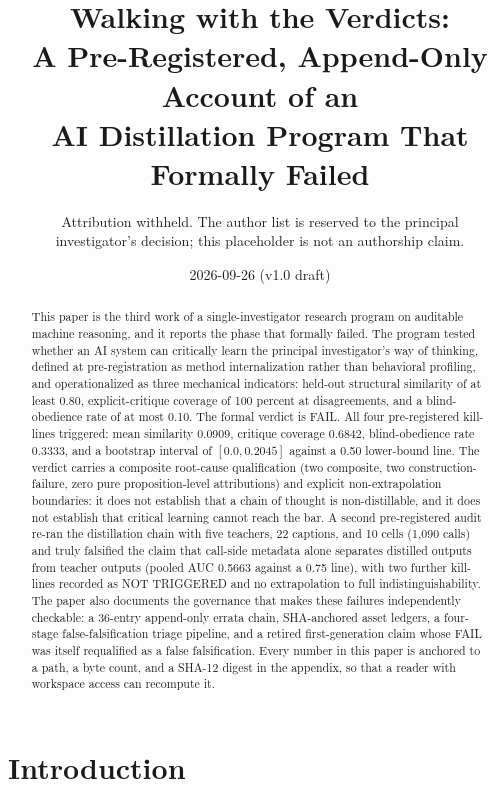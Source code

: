 \documentclass[11pt]{article}
\title{\bfseries Walking with the Verdicts:\\ A Pre-Registered, Append-Only Account of an\\ AI Distillation Program That Formally Failed}
\author{Attribution withheld. The author list is reserved to the principal\\ investigator's decision; this placeholder is not an authorship claim.}
\date{2026-09-26 (v1.0 draft)}
\begin{document}
\maketitle

\begin{abstract}
\noindent
This paper is the third work of a single-investigator research program on auditable machine reasoning, and it reports the phase that formally failed. The program tested whether an AI system can critically learn the principal investigator's way of thinking, defined at pre-registration as method internalization rather than behavioral profiling, and operationalized as three mechanical indicators: held-out structural similarity of at least 0.80, explicit-critique coverage of 100 percent at disagreements, and a blind-obedience rate of at most 0.10. The formal verdict is FAIL. All four pre-registered kill-lines triggered: mean similarity 0.0909, critique coverage 0.6842, blind-obedience rate 0.3333, and a bootstrap interval of $[0.0, 0.2045]$ against a 0.50 lower-bound line. The verdict carries a composite root-cause qualification (two composite, two construction-failure, zero pure proposition-level attributions) and explicit non-extrapolation boundaries: it does not establish that a chain of thought is non-distillable, and it does not establish that critical learning cannot reach the bar. A second pre-registered audit re-ran the distillation chain with five teachers, 22 captions, and 10 cells (1,090 calls) and truly falsified the claim that call-side metadata alone separates distilled outputs from teacher outputs (pooled AUC 0.5663 against a 0.75 line), with two further kill-lines recorded as NOT TRIGGERED and no extrapolation to full indistinguishability. The paper also documents the governance that makes these failures independently checkable: a 36-entry append-only errata chain, SHA-anchored asset ledgers, a four-stage false-falsification triage pipeline, and a retired first-generation claim whose FAIL was itself requalified as a false falsification. Every number in this paper is anchored to a path, a byte count, and a SHA-12 digest in the appendix, so that a reader with workspace access can recompute it.
\end{abstract}

\section{Introduction}
\end{document}

